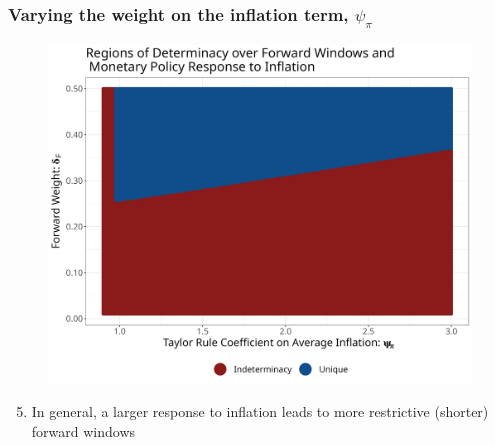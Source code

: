 \documentclass{beamer}
\begin{document}
\begin{frame}
	\frametitle{Varying the weight on the inflation term, $\psi_\pi$}	
	\begin{center}		
		\begin{figure}%
			\includegraphics[width=\textwidth,height=0.6\textheight,keepaspectratio]{../code/pi_deltaF.png}
		\end{figure}%
	\end{center}%
	\begin{enumerate}
		\setcounter{enumi}{4}
		\setlength{\itemsep}{1em}
		\item In general, a larger response to inflation leads to more restrictive (shorter) forward windows
	\end{enumerate}
\end{frame}
\end{document}
